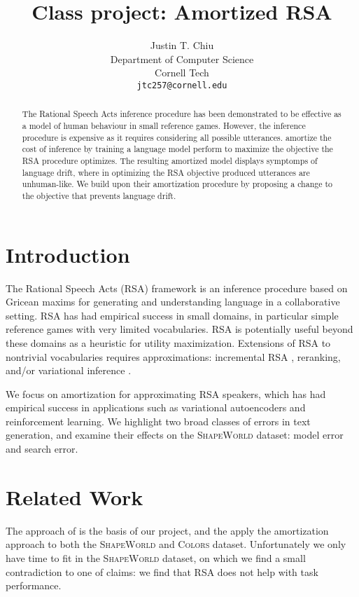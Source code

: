 \documentclass[11pt,a4paper]{article}
\title{Class project: Amortized RSA}
\author{Justin T. Chiu\\
  Department of Computer Science \\
  Cornell Tech \\
  \texttt{jtc257@cornell.edu}\\
}
\date{}
\begin{document}
\maketitle
\begin{abstract}
The Rational Speech Acts inference procedure has
been demonstrated to be effective as a model of human 
behaviour in small reference games.
However, the inference procedure is expensive
as it requires considering all possible utterances.
\citet{white2020learning} amortize the cost of inference by
training a language model perform to maximize the objective
the RSA procedure optimizes.
The resulting amortized model displays symptomps of
language drift, where in optimizing the RSA objective
produced utterances are unhuman-like.
We build upon their amortization procedure
by proposing a change to the objective
that prevents language drift.
\end{abstract}

\section{Introduction}
The Rational Speech Acts (RSA) framework is an inference procedure based on Gricean maxims 
for generating and understanding language in a collaborative setting.
RSA has had empirical success in small domains, in particular simple reference games
with very limited vocabularies.
RSA is potentially useful beyond these domains as a heuristic for utility maximization.
Extensions of RSA to nontrivial vocabularies requires approximations:
incremental RSA \citep{cohngordon2018pragmatically},
reranking, and/or variational inference \citep{white2020learning}.

We focus on amortization for approximating RSA speakers,
which has had empirical success in applications such as 
variational autoencoders and reinforcement learning.
We highlight two broad classes of errors in text generation,
and examine their effects on the \textsc{ShapeWorld} dataset:
model error and search error.

\section{Related Work}
The approach of \citet{white2020learning} is the basis of our project,
and the apply the amortization approach to both the \textsc{ShapeWorld}
and \textsc{Colors} dataset.
Unfortunately we only have time to fit in the \textsc{ShapeWorld} dataset,
on which we find a small contradiction to one of claims:
we find that RSA does not help with task performance.
\end{document}
